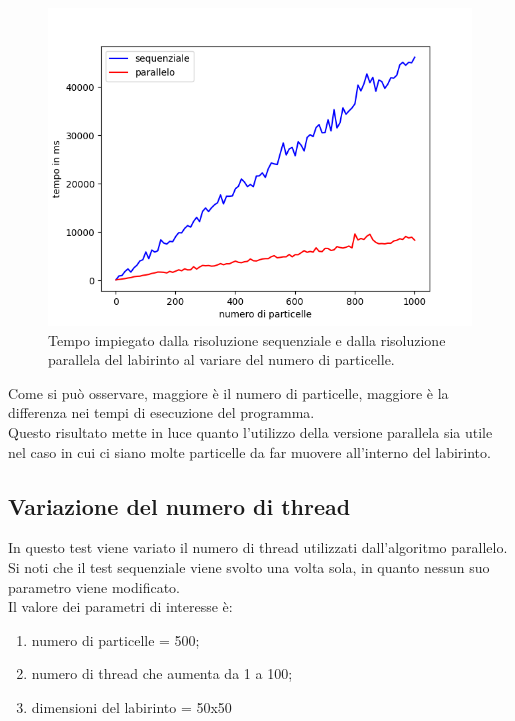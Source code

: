 \documentclass[10pt,twocolumn,letterpaper]{article}
\begin{document}
\begin{figure}[H]
\includegraphics[width=1.1\linewidth]{test/test2}
\caption{\small Tempo impiegato dalla risoluzione sequenziale e dalla risoluzione parallela del labirinto al variare del numero di particelle.}
\label{t2}
\end{figure}

Come si può osservare, maggiore è il numero di particelle, maggiore è la differenza nei tempi di esecuzione del programma.\\
Questo risultato mette in luce quanto l'utilizzo della versione parallela sia utile nel caso in cui ci siano molte particelle da far muovere all'interno del labirinto.

\subsection{Variazione del numero di thread}

In questo test viene variato il numero di thread utilizzati dall'algoritmo parallelo. Si noti che il test sequenziale viene svolto una volta sola, in quanto nessun suo parametro viene modificato.\\
Il valore dei parametri di interesse è:
\begin{enumerate}[-]
\item{numero di particelle = 500;}
\item{numero di thread che aumenta da 1 a 100;}
\item{dimensioni del labirinto = 50x50}
\end{enumerate}
\end{document}
